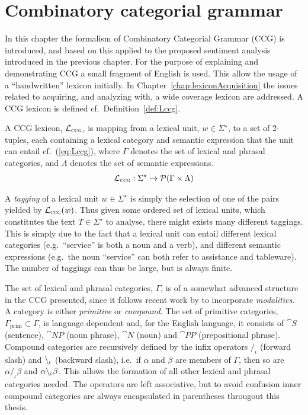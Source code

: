 
\chapter{Combinatory categorial grammar}
\label{chap:ccg}

In this chapter the formalism of Combinatory Categorial Grammar (CCG) is introduced, and based on this applied to the proposed sentiment analysis introduced in the previous chapter. For the purpose of explaining and demonstrating CCG a small fragment of English is used. This allow the usage of a ``handwritten'' lexicon initially. In Chapter~\ref{chap:lexiconAcquisition} the issues related to acquiring, and analyzing with, a wide coverage lexicon are addressed. A CCG lexicon is defined cf.\ Definition~\ref{def:Lccg}.

\begin{definition}
A CCG lexicon, $\mathcal{L}_\textsc{ccg}$, is mapping from a lexical unit, $w \in \Sigma^\star$, to a set of 2-tuples, each containing a lexical category and semantic expression that the unit can entail cf.\ (\ref{eq:Lccg}), where $\Gamma$ denotes the set of lexical and phrasal categories, and $\Lambda$ denotes the set of semantic expressions.
\begin{align}
 \mathcal{L}_\textsc{ccg}: \Sigma^\star \to \mathcal{P}(\Gamma \times \Lambda)
 \label{eq:Lccg}
\end{align}
\label{def:Lccg}
\vspace{-2em}
\done
\end{definition}

A \emph{tagging} of a lexical unit $w \in \Sigma^\star$ is simply the selection of one of the pairs yielded by $\mathcal{L}_\textsc{ccg}(w)$. Thus given some ordered set of lexical units, which constitutes the text $T \in \Sigma^\star$ to analyse, there might exists many different taggings. This is simply due to the fact that a lexical unit can entail different lexical categories (e.g.\ ``service'' is both a noun and a verb), and different semantic expressions (e.g.\ the noun ``service'' can both refer to assistance and tableware). The number of taggings can thus be large, but is always finite.

The set of lexical and phrasal categories, $\Gamma$, is of a somewhat advanced structure in the CCG presented, since it follows recent work by \citeauthor{multiModalCCG}  to incorporate \emph{modalities}. A category is either \emph{primitive} or \emph{compound}. The set of primitive categories, $\Gamma_\mathrm{prim} \subset \Gamma$, is language dependent and, for the English language, it consists of $\cat{S}$ (sentence), $\cat{NP}$ (noun phrase), $\cat{N}$ (noun) and $\cat{PP}$ (prepositional phrase). Compound categories are recursively defined by the infix operators $/_\iota$ (forward slash) and $\backslash_\iota$ (backward slash), i.e.\ if $\alpha$ and $\beta$ are members of $\Gamma$, then so are $\alpha/_\iota\beta$ and $\alpha \backslash_\iota \beta$. This allows the formation of all other lexical and phrasal categories needed. The operators are left associative, but to avoid confusion inner compound categories are always encapsulated in parentheses througout this thesis.

